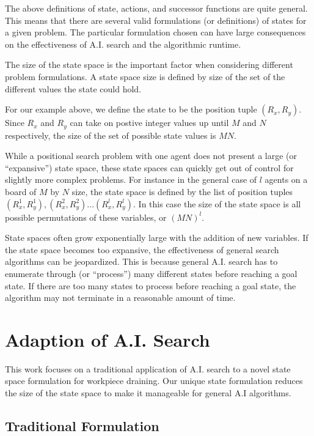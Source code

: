 The above definitions of state, actions, and successor functions are quite general. This means that there are several valid formulations (or definitions) of states for a given problem. The particular formulation chosen can have large consequences on the effectiveness of A.I. search and the algorithmic runtime.


The size of the state space is the important factor when considering different problem formulations. A state space size is defined by size of the set of the different values the state could hold.

For our example above, we define the state to be the position tuple $(R_x, R_y)$. Since $R_x$ and $R_y$ can take on postive integer values up until $M$ and $N$ respectively, the size of the set of possible state values is $MN$.

While a positional search problem with one agent does not present a large (or ``expansive'') state space, these state spaces can quickly get out of control for slightly more complex problems. For instance in the general case of $l$ agents on a board of $M$ by $N$ size, the state space is defined by the list of position tuples $(R^1_x, R^1_y), (R^2_x, R^2_y)... (R^l_x, R^l_y)$. In this case the size of the state space is all possible permutations of these variables, or $(MN)^l$.

State spaces often grow exponentially large with the addition of new variables. If the state space becomes too expansive, the effectiveness of general search algorithms can be jeopardized. This is because general A.I. search has to enumerate through (or ``process'') many different states before reaching a goal state. If there are too many states to process before reaching a goal state, the algorithm may not terminate in a reasonable amount of time.

\section{Adaption of A.I. Search}

This work focuses on a traditional application of A.I. search to a novel state space formulation for workpiece draining. Our unique state formulation reduces the size of the state space to make it manageable for general A.I algorithms.

	\subsection{Traditional Formulation}


